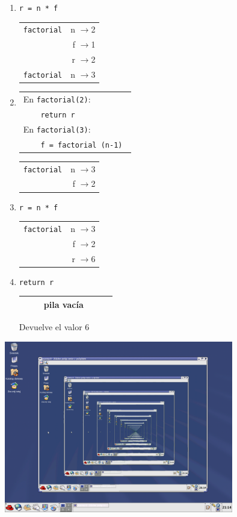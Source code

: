 \begin{enumerate}
\item  \verb|r = n * f                 | 
	\begin{tabular}{r|r|}
	\hline
	\verb|factorial|&n $\rightarrow$2\\
	  &f $\rightarrow$1\\
	  &r $\rightarrow$2\\
	\hline
	\hline
	\verb|factorial|&n $\rightarrow$3\\
	\hline
	\end{tabular}

\item
\begin{tabular}{l}
En \lstinline!factorial(2)!: \\ \verb|    return r| \\
En \lstinline!factorial(3)!: \\ \verb|    f = factorial (n-1) |
\end{tabular}
	\begin{tabular}{r|r|}
	\hline
	\verb|factorial|&n $\rightarrow$3\\
	&f $\rightarrow$2\\
	\hline
	\end{tabular}

\item  \verb|r = n * f                 |
	\begin{tabular}{r|r|}
	\hline
	\verb|factorial|&n $\rightarrow$3\\
	  &f $\rightarrow$2\\
	  &r $\rightarrow$6\\
	\hline
	\end{tabular}

\item  \verb|return r                  |
	\begin{tabular}{r|r|}
	\hline
	\verb!    ! pila vacía \verb!   ! \\
	\hline
	\end{tabular}
	\hspace{0.2cm} Devuelve el valor $6$
\end{enumerate}

\begin{minipage}{\linewidth}
\centering%
\includegraphics[width=10cm]{graficos/recursive}
%
\label{fig:redhat_recursivo}%
\end{minipage}

